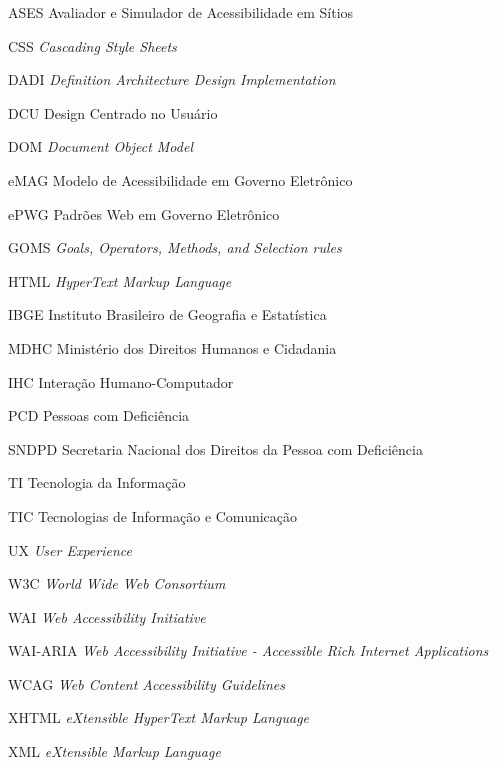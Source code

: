 \documentclass[
  12pt,
  openright,
  twoside,
  a4paper,
  english,
  french,
  spanish,
  brazil
]{abntex2}
\begin{document}
\begin{siglas}
  \item[ASES] Avaliador e Simulador de Acessibilidade em Sítios
  \item[CSS] \textit{Cascading Style Sheets}
  \item[DADI] \textit{Definition Architecture Design Implementation}
  \item[DCU] Design Centrado no Usuário
  \item[DOM] \textit{Document Object Model}
  \item[eMAG] Modelo de Acessibilidade em Governo Eletrônico
  \item[ePWG] Padrões Web em Governo Eletrônico
  \item[GOMS] \textit{Goals, Operators, Methods, and Selection rules}
  \item[HTML] \textit{HyperText Markup Language}
  \item[IBGE] Instituto Brasileiro de Geografia e Estatística
  \item[MDHC] Ministério dos Direitos Humanos e Cidadania
  \item[IHC] Interação Humano-Computador
  \item[PCD] Pessoas com Deficiência
  \item[SNDPD] Secretaria Nacional dos Direitos da Pessoa com Deficiência
  \item[TI] Tecnologia da Informação
  \item[TIC] Tecnologias de Informação e Comunicação
  \item[UX] \textit{User Experience}
  \item[W3C] \textit{World Wide Web Consortium}
  \item[WAI] \textit{Web Accessibility Initiative}
  \item[WAI-ARIA]
    \textit{
      Web Accessibility Initiative - Accessible Rich Internet Applications
    }
  \item[WCAG] \textit{Web Content Accessibility Guidelines}
  \item[XHTML] \textit{eXtensible HyperText Markup Language}
  \item[XML] \textit{eXtensible Markup Language}
\end{siglas}
\end{document}
